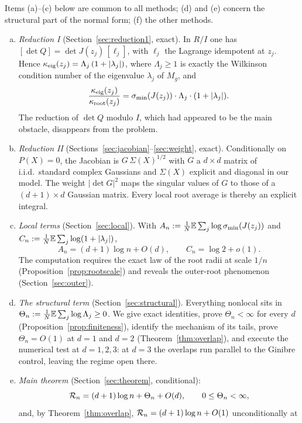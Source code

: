 Items (a)--(c) below are common to all methods; (d) and (e) concern the structural part of the
normal form; (f) the other methods.

\begin{enumerate}[(a)]
  \item \emph{Reduction I} (Section~\ref{sec:reduction1}, exact). In $R/I$ one has
    $[\det Q] = \det J(z_j)\,[\ell_j]$, with $\ell_j$ the Lagrange idempotent at $z_j$. Hence
    $\kappa_{\mathrm{eig}}(z_j) = \Lambda_j\,(1+|\lambda_j|)$, where $\Lambda_j\ge1$ is exactly the Wilkinson
    condition number of the eigenvalue $\lambda_j$ of $M_g$, and
    \[
      \frac{\kappa_{\mathrm{eig}}(z_j)}{\kappa_{\mathrm{root}}(z_j)}
      = \sigma_{\min}(J(z_j))\cdot\Lambda_j\cdot(1+|\lambda_j|).
    \]
    The reduction of $\det Q$ modulo $I$, which had appeared to be the main obstacle,
    disappears from the problem.
  \item \emph{Reduction II} (Sections~\ref{sec:jacobian}--\ref{sec:weight}, exact).
    Conditionally on $P(X)=0$, the Jacobian is $G\,\Sigma(X)^{1/2}$ with $G$ a $d\times d$
    matrix of i.i.d.\ standard complex Gaussians and $\Sigma(X)$ explicit and diagonal in our
    model. The weight $|\det G|^2$ maps the singular values of $G$ to those of a
    $(d+1)\times d$ Gaussian matrix. Every local root average is thereby an explicit integral.
  \item \emph{Local terms} (Section~\ref{sec:local}). With
    $A_n:=\frac1N\mathbb{E}\sum_j\log\sigma_{\min}(J(z_j))$ and
    $C_n:=\frac1N\mathbb{E}\sum_j\log(1+|\lambda_j|)$,
    \[
      A_n = (d+1)\log n + O(d), \qquad C_n = \log2 + o(1).
    \]
    The computation requires the exact law of the root radii at scale $1/n$
    (Proposition~\ref{prop:rootscale}) and reveals the outer-root phenomenon
    (Section~\ref{sec:outer}).
  \item \emph{The structural term} (Section~\ref{sec:structural}). Everything nonlocal sits in
    $\Theta_n := \frac1N\mathbb{E}\sum_j\log\Lambda_j\ge0$. We give exact identities, prove
    $\Theta_n<\infty$ for every $d$ (Proposition~\ref{prop:finiteness}), identify the
    mechanism of its tails, prove $\Theta_n=O(1)$ at $d=1$ and $d=2$
    (Theorem~\ref{thm:overlap}), and execute the numerical test at $d=1,2,3$: at $d=3$ the
    overlaps run parallel to the Ginibre control, leaving the regime open there.
  \item \emph{Main theorem} (Section~\ref{sec:theorem}, conditional):
    \[
      \mathcal{R}_n = (d+1)\log n + \Theta_n + O(d), \qquad 0\le\Theta_n<\infty,
    \]
    and, by Theorem~\ref{thm:overlap}, $\mathcal{R}_n = (d+1)\log n + O(1)$ unconditionally at

\end{enumerate}
